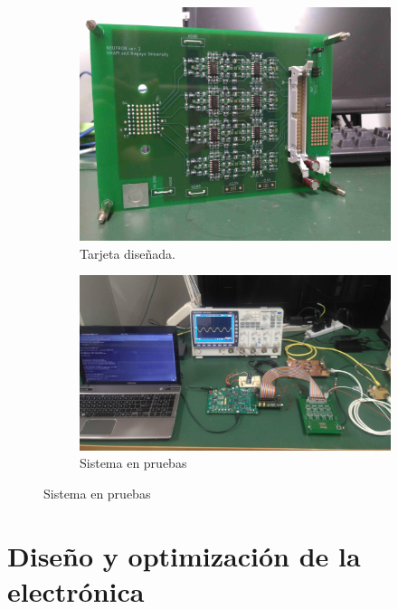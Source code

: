 \begin{figure}
  \centering
  \begin{subfigure}[b]{0.49\textwidth}
	\includegraphics[width=\textwidth]{neutron_ver1.jpg}
	\caption{Tarjeta diseñada.}
	\label{fig:neutron-pcb}
  \end{subfigure}
  \begin{subfigure}[b]{0.49\textwidth}
	\includegraphics[width=\textwidth]{complete-system.jpg}
	\caption{Sistema en pruebas}
	\label{fig:complete-sys}
  \end{subfigure}
\end{figure}

\section{Diseño y optimización de la electrónica}



